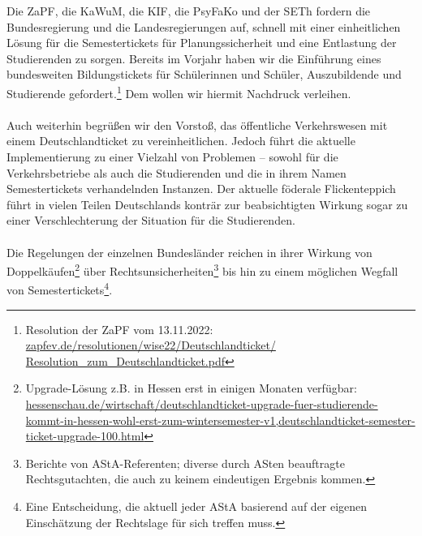 \documentclass[DIV=calc]{scrartcl}
\begin{document}
Die ZaPF, die KaWuM, die KIF, die PsyFaKo und der SETh fordern die Bundesregierung und die Landesregierungen auf, schnell mit einer einheitlichen Lösung für die Semestertickets für Planungssicherheit und eine Entlastung der Studierenden zu sorgen.
Bereits im Vorjahr haben wir die Einführung eines bundesweiten Bildungstickets für Schülerinnen und Schüler, Auszubildende und Studierende gefordert.\footnote{Resolution der ZaPF vom 13.11.2022: \href{https://zapfev.de/resolutionen/wise22/Deutschlandticket/Resolution\_zum\_Deutschlandticket.pdf}{zapfev.de/resolutionen/wise22/Deutschlandticket/\\Resolution\_zum\_Deutschlandticket.pdf}} Dem wollen wir hiermit Nachdruck verleihen.\\\\
%
Auch weiterhin begrüßen wir den Vorstoß, das öffentliche Verkehrswesen mit einem Deutschlandticket zu vereinheitlichen. Jedoch führt die aktuelle Implementierung zu einer Vielzahl von Problemen -- sowohl für die Verkehrsbetriebe als auch die Studierenden und die in ihrem Namen Semestertickets verhandelnden Instanzen. Der aktuelle föderale Flickenteppich führt in vielen Teilen Deutschlands konträr zur beabsichtigten Wirkung sogar zu einer Verschlechterung der Situation für die Studierenden.\\\\
%
Die Regelungen der einzelnen Bundesländer reichen in ihrer Wirkung von Doppelkäufen\footnote{Upgrade-Lösung z.B. in Hessen erst in einigen Monaten verfügbar: \href{https://www.hessenschau.de/wirtschaft/deutschlandticket-upgrade-fuer-studierende-kommt-in-hessen-wohl-erst-zum-wintersemester-v1,deutschlandticket-semester-ticket-upgrade-100.html}{hessenschau.de/wirtschaft/deutschlandticket-upgrade-fuer-studierende-kommt-in-hessen-wohl-erst-zum-wintersemester-v1,deutschlandticket-semester-ticket-upgrade-100.html}} über Rechtsunsicherheiten\footnote{Berichte von AStA-Referenten; diverse durch ASten beauftragte Rechtsgutachten, die auch zu keinem eindeutigen Ergebnis kommen.} bis hin zu einem möglichen Wegfall von Semestertickets\footnote{Eine Entscheidung, die aktuell jeder AStA basierend auf der eigenen Einschätzung der Rechtslage für sich treffen muss.}.\\
\end{document}
